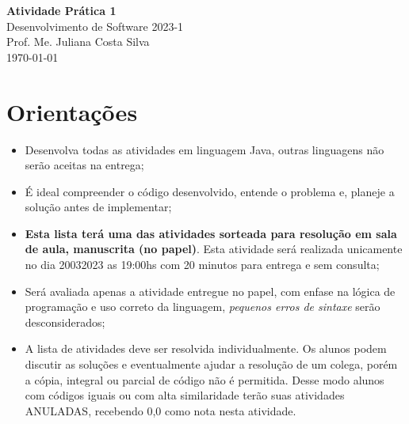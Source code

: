 \documentclass[12pt,a4paper, brazil]{article}
\begin{document}
\begin{center}
{\textbf {\huge Atividade Prática 1}}\\[5mm]
{\large Desenvolvimento de Software 2023-1} \\
{\large Prof. Me. Juliana Costa Silva} \\
\today\\[5mm] %
\end{center}

\section*{Orientações}

\begin{itemize}
  \item Desenvolva todas as atividades em linguagem Java, outras linguagens não serão aceitas na entrega;
  \item É ideal compreender o código desenvolvido, entende o problema e, planeje a solução antes de implementar;
  \item \textbf{Esta lista terá uma das atividades sorteada para resolução em sala de aula, manuscrita (no papel)}. Esta atividade será realizada unicamente no dia 20\/03\/2023 as 19:00hs com 20 minutos para entrega e sem consulta;
  \item Será avaliada apenas a atividade entregue no papel, com enfase na lógica de programação e uso correto da linguagem, \textit{pequenos erros de sintaxe} serão desconsiderados;
  \item A lista de atividades deve ser resolvida individualmente. Os alunos podem discutir as soluções e eventualmente ajudar a resolução de um colega, porém a cópia, integral ou parcial de código não é permitida. Desse modo alunos com códigos iguais ou com alta similaridade terão suas atividades ANULADAS, recebendo 0,0 como nota nesta atividade.
\end{itemize}


\vspace{0.5cm}
\end{document}
